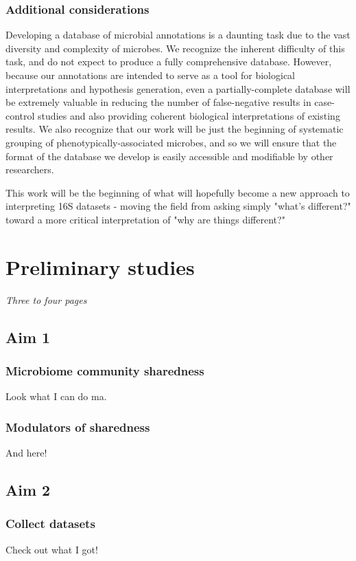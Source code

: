 \documentclass[12pt]{article}
\begin{document}
\subsubsection{Additional considerations}
Developing a database of microbial annotations is a daunting task due 
to the vast diversity and complexity of microbes. We recognize the 
inherent difficulty of this task, and do not expect to produce a fully 
comprehensive database. However, because our annotations are intended 
to serve as a tool for biological interpretations and hypothesis 
generation, even a partially-complete database will be extremely 
valuable in reducing the number of false-negative results in case-
control studies and also providing coherent biological interpretations 
of existing results. We also recognize that our work will be just the 
beginning of systematic grouping of phenotypically-associated 
microbes, and so we will ensure that the format of the database we 
develop is easily accessible and modifiable by other researchers.

This work will be the beginning of what will hopefully become a new 
approach to interpreting 16S datasets - moving the field from asking 
simply "what's different?" toward a more critical interpretation of 
"why are things different?"

\section{Preliminary studies}
\textit{Three to four pages}

\subsection{Aim 1}
\subsubsection{Microbiome community sharedness}
Look what I can do ma.

\subsubsection{Modulators of sharedness}
And here!

\subsection{Aim 2}
\subsubsection{Collect datasets}
Check out what I got!
\end{document}
